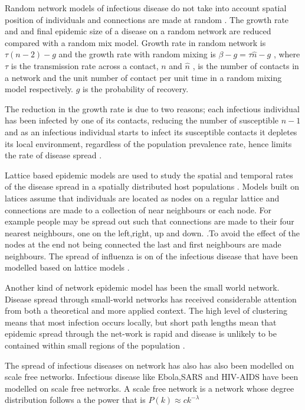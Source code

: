 Random network models of infectious disease do not take into account spatial position of individuals and connections are made at random \citep{keeling2005networks}. The growth rate and and final epidemic size of a disease on a random network are reduced compared with a random mix model. Growth rate in random network is $\tau (n -2) - g$ and the growth rate with random mixing is $\beta - g = \tau \widehat{n} -g$ , where  $\tau$ is the transmission rate across a contact, $n$ and $\widehat{n} $ , is the number of contacts in a network and the unit number of contact per unit time in a random mixing model respectively. $g$ is the probability of recovery.
 
The reduction in the growth rate is due to two reasons; each infectious individual has been infected by one of its contacts, reducing the number of susceptible $n-1$ and as an infectious individual starts to infect its susceptible contacts it depletes its local environment, regardless of the population prevalence rate, hence limits the rate of disease spread \citep{keeling2005networks}.

Lattice based epidemic models are used to study the spatial and temporal rates of the disease spread in  a spatially distributed host populations \citep{rhodes1997epidemic}. Models built on latices assume that individuals are located as nodes on a regular lattice and connections are made to a collection of near neighbours or each node. For example people may be spread out such that connections are made to their four nearest neighbours, one on the left,right, up and down. \citep{lloyd2006infection}.To avoid the effect of the nodes at the end not being connected the last and first neighbours are made neighbours. The spread of influenza is on of the infectious disease that have been modelled based on lattice models \cite{liccardo2013lattice}. 

Another kind of network epidemic model has been the small world network. Disease spread through small-world networks has received considerable attention from both a theoretical and more applied context. The high level of clustering means that most infection occurs locally, but short path lengths mean that epidemic spread through the net-work is rapid and disease is unlikely to be contained within small regions of the population \citep{watts1998collective}.

The spread of infectious diseases on network has also has also been modelled on scale free networks. Infectious disease like Ebola,SARS and HIV-AIDS have been modelled on scale free networks. A scale free network is a network whose degree distribution follows a the power that is $P(k) \approx ck^{-\lambda}$  \citep{morita2016six}


